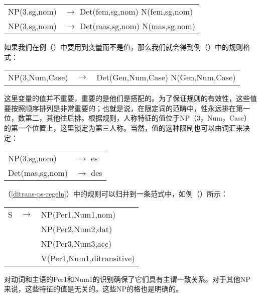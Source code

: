 \ea
\begin{tabular}[t]{@{}l@{ }l}
NP(3,sg,nom)  & $\to$ Det(fem,sg,nom) N(fem,sg,nom)\\
NP(3,sg,nom)  & $\to$ Det(mas,sg,nom) N(mas,sg,nom)\\
\end{tabular}
\z
如果我们在例（）中要用到变量而不是值，那么我们就会得到例（）中的规则格式：
\ea
\label{Regel-mit-Variablen}
\begin{tabular}[t]{@{}l@{ }l@{ }l}
NP({3},{Num},{Case}) & $\to$ & Det(Gen,{Num},{Case}) N(Gen,{Num},{Case})\\
\end{tabular}
\z
这里变量的值并不重要，重要的是他们是搭配的。为了保证规则的有效性，这些值要按照顺序排列是非常重要的；也就是说，在限定词的范畴中，性永远排在第一位，数第二，其他往后排。根据规则，人称特征的值位于NP（3，Num，Case）的第一个位置上，这里锁定为第三人称。当然，值的这种限制也可以由词汇来决定：
\ea
\begin{tabular}[t]{@{}l@{ }l}
NP(3,sg,nom)  & $\to$ es\\
Det(mas,sg,nom)  & $\to$ des\\
\end{tabular}
\z

\noindent
（\ref{ditrans-ps-regeln}）中的规则可以归并到一条范式中，如例（）所示：
\ea
\label{ditrans-schema}
\begin{tabular}[t]{@{}l@{ }l@{ }l}
S  & $\to$ & NP({Per1},{Num1},{nom}) \\
   &       & NP(Per2,Num2,{dat})\\
   &       & NP(Per3,Num3,{acc})\\
   &       & V({Per1},{Num1},ditransitive)\\
\end{tabular}
\z
对动词和主语的Per1和Num1的识别确保了它们具有主谓一致关系。对于其他NP来说，这些特征的值是无关的。这些NP的格也是明确的。

